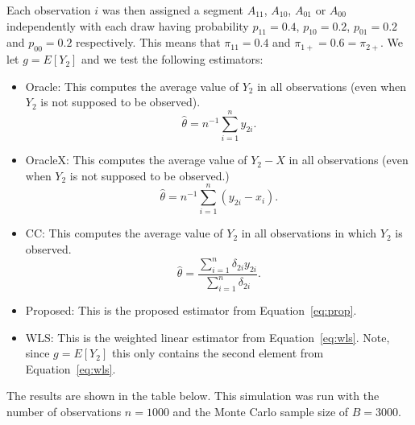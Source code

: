 \documentclass[12pt]{article}
\begin{document}
\begin{itemize}
    Each observation $i$ was then assigned a segment $A_{11}$, $A_{10}$,
    $A_{01}$ or $A_{00}$ independently with each draw having probability
    $p_{11} = 0.4$, $p_{10} = 0.2$, $p_{01}= 0.2$ and $p_{00} = 0.2$
    respectively. This means that $\pi_{11} = 0.4$ and 
    $\pi_{1+} = 0.6 = \pi_{2+}$. We let $g = E[Y_2]$ and we test the following
    estimators:

    \begin{itemize}
      \item Oracle: This computes the average value of $Y_2$ in all 
        observations (even when $Y_2$ is not supposed to be observed).
        \[\hat \theta = n^{-1} \sum_{i = 1}^n y_{2i}.\]

      \item OracleX: This computes the average value of $Y_2 - X$ in 
        all observations (even when $Y_2$ is not supposed to be observed.)
        \[\hat \theta = n^{-1} \sum_{i = 1}^n (y_{2i} - x_i).\]

      \item CC: This computes the average value of $Y_2$ in all observations 
        in which $Y_2$ is observed.
        \[\hat \theta = \frac{\sum_{i = 1}^n \delta_{2i} y_{2i}}
          {\sum_{i = 1}^n \delta_{2i}}.\]

      \item Proposed: This is the proposed estimator from Equation~\ref{eq:prop}.
      \item WLS: This is the weighted linear estimator from Equation~\ref{eq:wls}.
        Note, since $g = E[Y_2]$ this only contains the second element from
        Equation~\ref{eq:wls}.
    \end{itemize}

    The results are shown in the table below. This simulation was run with the 
    number of observations $n = 1000$ and the Monte Carlo sample size of 
    $B = 3000$.


\end{itemize}
\end{document}
